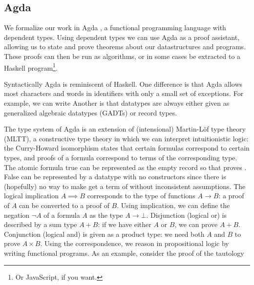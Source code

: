 \subsection{Agda}
We formalize our work in Agda \cite{agda}, a functional programming language with dependent types. Using dependent types we can use Agda as a proof assistant, allowing us to state and prove theorems about our datastructures and programs. These proofs can then be run as algorithms, or in some cases be extracted to a Haskell program\footnote{Or JavaScript, if you want.}.

Syntactically Agda is reminiscent of Haskell. One difference is that Agda allows most characters and words in identifiers with only a small set of exceptions. For example, we can write
Another is that datatypes are always either given as generalized algebraic datatypes (GADTs) or record types.

The type system of Agda is an extension of (intensional) Martin-Löf type theory (MLTT), a constructive type theory in which we can interpret intuitionistic logic: the Curry-Howard isomorphism states that certain formulas correspond to certain types, and proofs of a formula correspond to terms of the corresponding type. The atomic formula true can be represented as the empty record
so that  proves . False can be represented by a datatype with no constructors
since there is (hopefully) no way to make get a term of  without inconsistent assumptions. The logical implication $A \implies B$ corresponds to the type of functions $A \to B$: a proof of $A$ can be converted to a proof of $B$. Using implication, we can define the negation $\lnot A$ of a formula $A$ as the type $A \to \bot$. Disjunction (logical or) is described by a sum type $A + B$:
if we have either $A$ or $B$, we can prove $A + B$. Conjunction (logical and) is given as a product type:
we need both $A$ and $B$ to prove $A \times B$. Using the correspondence, we reason in propositional logic by writing functional programs. As an example, consider the proof of the tautology 

